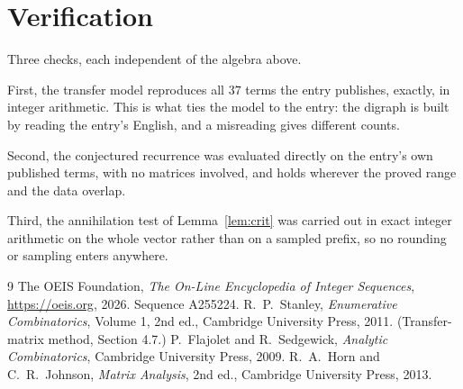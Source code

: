\documentclass[11pt,a4paper]{article}
\theoremstyle{plain}
\theoremstyle{definition}
\begin{document}
\section{Verification}

Three checks, each independent of the algebra above.

First, the transfer model reproduces all $37$ terms the entry publishes, exactly, in
integer arithmetic. This is what ties the model to the entry: the digraph is built by reading
the entry's English, and a misreading gives different counts.

Second, the conjectured recurrence was evaluated directly on the entry's own published terms,
with no matrices involved, and holds wherever the proved range and the data overlap.

Third, the annihilation test of Lemma~\ref{lem:crit} was carried out in exact integer
arithmetic on the whole vector rather than on a sampled prefix, so no rounding or sampling
enters anywhere.

\begin{thebibliography}{9}
 The OEIS Foundation, \emph{The On-Line Encyclopedia of Integer
Sequences}, \url{https://oeis.org}, 2026. Sequence A255224.
 R.~P.~Stanley, \emph{Enumerative Combinatorics}, Volume 1, 2nd ed.,
Cambridge University Press, 2011. (Transfer-matrix method, Section 4.7.)
 P.~Flajolet and R.~Sedgewick, \emph{Analytic Combinatorics}, Cambridge
University Press, 2009.
 R.~A.~Horn and C.~R.~Johnson, \emph{Matrix Analysis}, 2nd ed., Cambridge
University Press, 2013.
\end{thebibliography}
\end{document}
